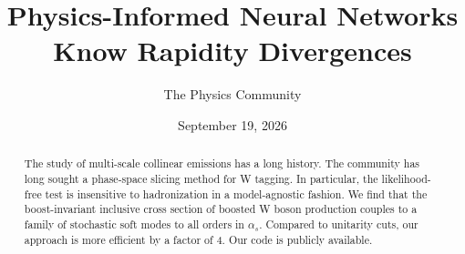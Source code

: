 \documentclass[11pt]{article}
\title{Physics-Informed Neural Networks Know Rapidity Divergences}
\author{The Physics Community}
\date{September 19, 2026}
\begin{document}
\maketitle
\begin{abstract}
The study of multi-scale collinear emissions has a long history. The
community has long sought a phase-space slicing method for W tagging. In
particular, the likelihood-free test is insensitive to hadronization in
a model-agnostic fashion. We find that the boost-invariant inclusive
cross section of boosted W boson production couples to a family of
stochastic soft modes to all orders in $\alpha_s$. Compared to unitarity
cuts, our approach is more efficient by a factor of 4. Our code is
publicly available.
\end{abstract}
\tableofcontents





\nocite{*}


\end{document}
